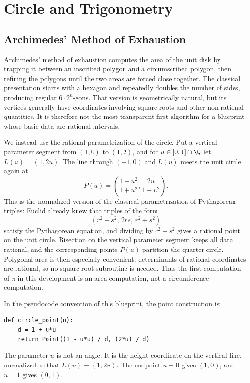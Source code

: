 \chapter{Circle and Trigonometry}
\label{ch:rational-circle-trigonometry}

\section{Archimedes' Method of Exhaustion}

Archimedes' method of exhaustion computes the area of the unit disk by
trapping it between an inscribed polygon and a circumscribed polygon, then
refining the polygons until the two areas are forced close together.  The
classical presentation starts with a hexagon and repeatedly doubles the number
of sides, producing regular \(6\cdot2^n\)-gons.  That version is geometrically
natural, but its vertices generally have coordinates involving square roots
and other non-rational quantities.  It is therefore not the most transparent
first algorithm for a blueprint whose basic data are rational intervals.

We instead use the rational parametrization of the circle.  Put a vertical
parameter segment from \((1,0)\) to \((1,2)\), and for \(u\in[0,1]\cap\Q\)
let \(L(u)=(1,2u)\).  The line through \((-1,0)\) and \(L(u)\) meets the unit
circle again at
\[
  P(u)=
  \left(
    \frac{1-u^2}{1+u^2},
    \frac{2u}{1+u^2}
  \right).
\]
This is the normalized version of the classical parametrization of
Pythagorean triples: Euclid already knew that triples of the form
\[
  (r^2-s^2,\,2rs,\,r^2+s^2)
\]
satisfy the Pythagorean equation, and dividing by \(r^2+s^2\) gives a rational
point on the unit circle.  Bisection on the vertical parameter segment keeps
all data rational, and the corresponding points \(P(u)\) partition the
quarter-circle.  Polygonal area is then especially convenient: determinants
of rational coordinates are rational, so no square-root subroutine is needed.
Thus the first computation of \(\pi\) in this development is an area
computation, not a circumference computation.

\begin{remark}
\label{rem:rational-circle-point}
In the pseudocode convention of this blueprint, the point construction is:
\begin{verbatim}
def circle_point(u):
    d = 1 + u*u
    return Point((1 - u*u) / d, (2*u) / d)
\end{verbatim}
The parameter \(u\) is not an angle.  It is the height coordinate on the
vertical line, normalized so that \(L(u)=(1,2u)\).  The endpoint \(u=0\) gives
\((1,0)\), and \(u=1\) gives \((0,1)\).
\end{remark}

